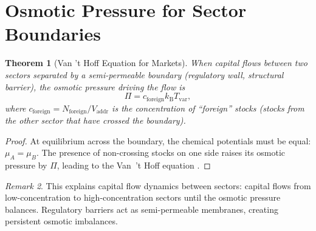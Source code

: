 \documentclass[twocolumn,10pt]{article}
\newtheorem{theorem}{Theorem}[section]
\theoremstyle{remark}
\newtheorem{remark}[theorem]{Remark}
\newcommand{\kB}{k_{\mathrm{B}}}
\newcommand{\Tvar}{T_{\mathrm{var}}}
\newcommand{\Vaddr}{V_{\mathrm{addr}}}
\begin{document}

\section{Osmotic Pressure for Sector Boundaries}
\label{sec:osmotic}

\begin{theorem}[Van 't Hoff Equation for Markets]
\label{thm:vant_hoff}
When capital flows between two sectors separated by a semi-permeable boundary (regulatory wall, structural barrier), the osmotic pressure driving the flow is
\begin{equation}
    \Pi = c_{\mathrm{foreign}} \kB \Tvar,
    \label{eq:osmotic}
\end{equation}
where $c_{\mathrm{foreign}} = N_{\mathrm{foreign}} / \Vaddr$ is the concentration of ``foreign'' stocks (stocks from the other sector that have crossed the boundary).
\end{theorem}

\begin{proof}
At equilibrium across the boundary, the chemical potentials must be equal: $\mu_A = \mu_B$.  The presence of non-crossing stocks on one side raises its osmotic pressure by $\Pi$, leading to the Van~'t Hoff equation \cite{landau1980}.
\end{proof}

\begin{remark}
This explains capital flow dynamics between sectors: capital flows from low-concentration to high-concentration sectors until the osmotic pressure balances.  Regulatory barriers act as semi-permeable membranes, creating persistent osmotic imbalances.
\end{remark}
\end{document}

